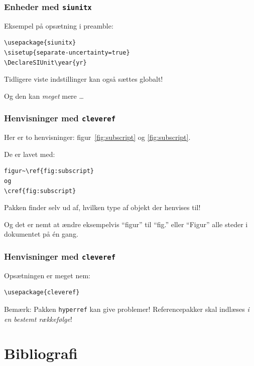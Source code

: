\documentclass{beamer}
\newcommand{\plainbreak}[1]{\vspace{#1\baselineskip}}
\begin{document}
\begin{frame}[fragile]
    \frametitle{Enheder med \texttt{siunitx}}

    Eksempel på opsætning i preamble:

    \plainbreak1

\begin{verbatim}
\usepackage{siunitx}
\sisetup{separate-uncertainty=true}
\DeclareSIUnit\year{yr}
\end{verbatim}

    \plainbreak1

    Tidligere viste indstillinger kan også sættes \alert{globalt}!

    Og den kan \emph{meget} mere \ldots
\end{frame}


\begin{frame}[fragile]
  \frametitle{Henvisninger med \texttt{cleveref}}

  Her er to henvisninger: figur~\ref{fig:subscript} og \cref{fig:subscript}.

  De er lavet med:

\begin{verbatim}
figur~\ref{fig:subscript}
og
\cref{fig:subscript}
\end{verbatim}

  \plainbreak1

  Pakken \alert{finder selv ud af}, hvilken type af objekt der henvises til!

  Og det er nemt at ændre eksempelvis ``figur'' til ``fig.'' eller ``Figur''
  \alert{alle steder} i dokumentet på én gang.
\end{frame}


\begin{frame}[fragile]
    \frametitle{Henvisninger med \texttt{cleveref}}

    Opsætningen er meget nem:

    \plainbreak1

\begin{verbatim}
\usepackage{cleveref}
\end{verbatim}

    \plainbreak1

    \alert{Bemærk:} Pakken \texttt{hyperref} kan give problemer! Referencepakker
    skal indlæses \emph{i en bestemt rækkefølge}!
\end{frame}


\section{Bibliografi}
\end{document}

